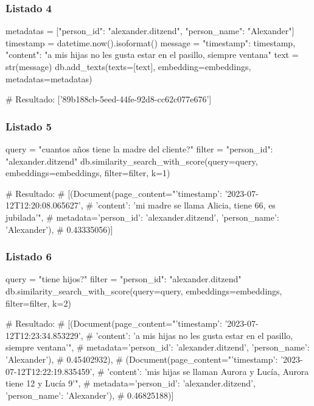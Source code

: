 \subsubsection{Listado 4}
\label{anexo:code-4-1-3-4}

\begin{APACode}
metadatas = [{"person_id": "alexander.ditzend", "person_name": "Alexander"}] 
timestamp = datetime.now().isoformat()
message = {"timestamp": timestamp, 
           "content": "a mis hijas no les gusta estar en el pasillo, siempre ventana"} 
text = str(message)
db.add_texts(texts=[text], embedding=embeddings, metadatas=metadatas)

# Resultado: ['89b188cb-5eed-44fe-92d8-cc62c077e676']
\end{APACode}

\subsubsection{Listado 5}
\label{anexo:code-4-1-3-5}

\begin{APACode}
query = "cuantos años tiene la madre del cliente?" 
filter = {"person_id": "alexander.ditzend"}
db.similarity_search_with_score(query=query, embeddings=embeddings, 
                                filter=filter, k=1)

# Resultado:
# [(Document(page_content="{'timestamp': '2023-07-12T12:20:08.065627', 
#    'content': 'mi madre se llama Alicia, tiene 66, es jubilada'}", 
#    metadata={'person_id': 'alexander.ditzend', 'person_name': 'Alexander'}),
#   0.43335056)]
\end{APACode}

\subsubsection{Listado 6}
\label{anexo:code-4-1-3-6}

\begin{APACode}
query = "tiene hijos?"
filter = {"person_id": "alexander.ditzend"} 
db.similarity_search_with_score(query=query, embeddings=embeddings, 
                                filter=filter, k=2)

# Resultado:
# [(Document(page_content="{'timestamp': '2023-07-12T12:23:34.853229', 
#    'content': 'a mis hijas no les gusta estar en el pasillo, siempre ventana'}", 
#    metadata={'person_id': 'alexander.ditzend', 'person_name': 'Alexander'}),
#   0.45402932),
#  (Document(page_content="{'timestamp': '2023-07-12T12:22:19.835459', 
#    'content': 'mis hijas se llaman Aurora y Lucía, Aurora tiene 12 y Lucía 9'}", 
#    metadata={'person_id': 'alexander.ditzend', 'person_name': 'Alexander'}), 
#   0.46825188)]
\end{APACode}

